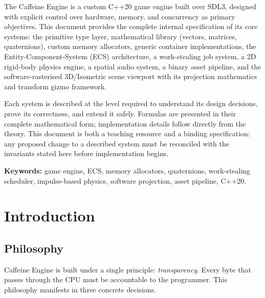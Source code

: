 \documentclass[12pt, a4paper]{report}
\theoremstyle{definition}
\theoremstyle{remark}
\begin{document}
The Caffeine Engine is a custom C++20 game engine built over SDL3, designed
with explicit control over hardware, memory, and concurrency as primary
objectives. This document provides the complete internal specification of its
core systems: the primitive type layer, mathematical library
(vectors, matrices, quaternions), custom memory allocators, generic
container implementations, the Entity-Component-System (ECS) architecture,
a work-stealing job system, a 2D rigid-body physics engine, a spatial audio
system, a binary asset pipeline, and the software-rasterised 3D/Isometric
scene viewport with its projection mathematics and transform gizmo framework.

Each system is described at the level required to understand its design
decisions, prove its correctness, and extend it safely. Formulas are
presented in their complete mathematical form; implementation details follow
directly from the theory. This document is both a teaching resource and a
binding specification: any proposed change to a described system must be
reconciled with the invariants stated here before implementation begins.

\bigskip
\textbf{Keywords:} game engine, ECS, memory allocators, quaternions, work-stealing
scheduler, impulse-based physics, software projection, asset pipeline, C++20.

\pagestyle{plain}
\tableofcontents
\listoffigures
\listoftables

\cleardoublepage
\setcounter{page}{1}
\pagestyle{fancy}

\chapter{Introduction}

\section{Philosophy}

Caffeine Engine is built under a single principle: \emph{transparency}.
Every byte that passes through the CPU must be accountable to the
programmer. This philosophy manifests in three concrete decisions.
\end{document}

